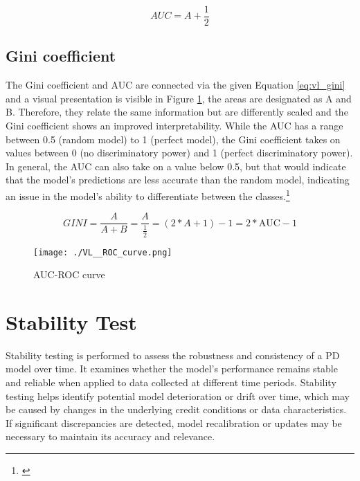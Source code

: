 \begin{equation}
AUC = A + \frac{1}{2} \label{eq:vl_auc}
\end{equation}

\subsection{Gini coefficient}
\label{sec:gini}
The Gini coefficient and \ac{AUC} are connected via the given Equation \ref{eq:vl_gini} and a visual presentation is visible in Figure \ref{fig:vl_roccurve}, the areas are designated as A and B. Therefore, they relate the same information but are differently scaled and the Gini coefficient shows an improved interpretability. While the \ac{AUC} has a range between 0.5 (random model) to 1 (perfect model), the Gini coefficient takes on values between 0 (no discriminatory power) and 1 (perfect discriminatory power). In general, the \ac{AUC} can also take on a value below 0.5, but that would indicate that the model's predictions are less accurate than the random model, indicating an issue in the model's ability to differentiate between the classes.\footnote{\cite{AUC:2023}}

\begin{equation}
GINI = \frac{A}{A + B} = \frac{A}{\frac{1}{2}} = (2 * A + 1) - 1 = 2 * \text{AUC} - 1 \label{eq:vl_gini}
\end{equation}

\begin{figure}[H]
	\centering
	\texttt{[image: ./VL\_\_ROC\_curve.png]}
    \caption{AUC-ROC curve}
    \label{fig:vl_roccurve}
\end{figure}

\section{Stability Test}
Stability testing is performed to assess the robustness and consistency of a PD model over time. It examines whether the model's performance remains stable and reliable when applied to data collected at different time periods. Stability testing helps identify potential model deterioration or drift over time, which may be caused by changes in the underlying credit conditions or data characteristics. If significant discrepancies are detected, model recalibration or updates may be necessary to maintain its accuracy and relevance.
